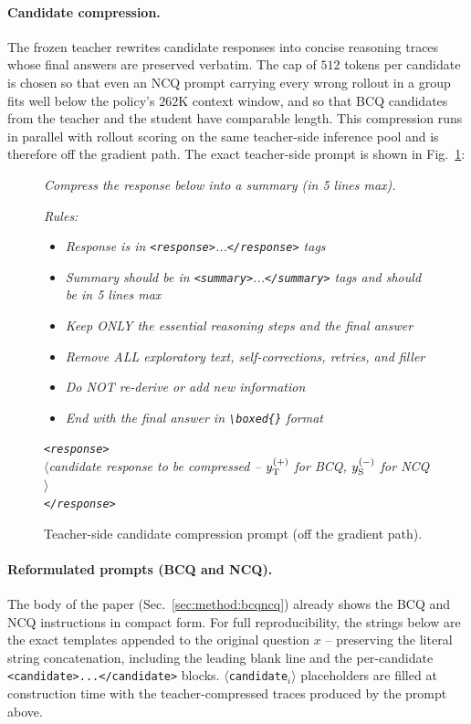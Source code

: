 \paragraph{Candidate compression.}
The frozen teacher rewrites candidate responses into concise reasoning traces whose final answers are preserved verbatim. The cap of $512$ tokens per candidate is chosen so that even an NCQ prompt carrying every wrong rollout in a group fits well below the policy's $262$K context window, and so that BCQ candidates from the teacher and the student have comparable length. This compression runs in parallel with rollout scoring on the same teacher-side inference pool and is therefore off the gradient path. The exact teacher-side prompt is shown in Fig.~\ref{fig:prompt-compression}:
\begin{figure}[!htbp]
\begin{prompttemplatefig}
\small
\emph{Compress the response below into a summary (in 5 lines max).}

\emph{Rules:}
\begin{itemize}[leftmargin=12pt,topsep=1pt,itemsep=1pt]
    \item \emph{Response is in \texttt{<response>}...\texttt{</response>} tags}
    \item \emph{Summary should be in \texttt{<summary>}...\texttt{</summary>} tags and should be in 5 lines max}
    \item \emph{Keep ONLY the essential reasoning steps and the final answer}
    \item \emph{Remove ALL exploratory text, self-corrections, retries, and filler}
    \item \emph{Do NOT re-derive or add new information}
    \item \emph{End with the final answer in \texttt{\textbackslash boxed\{\}} format}
\end{itemize}
\emph{\texttt{<response>}\\
$\langle$\emph{candidate response to be compressed} -- $y_{\rm T}^{(+)}$ for BCQ, $y_{\rm S}^{(-)}$ for NCQ$\rangle$\\
\texttt{</response>}}
\end{prompttemplatefig}
\caption{Teacher-side candidate compression prompt (off the gradient path).}
\label{fig:prompt-compression}
\end{figure}

\paragraph{Reformulated prompts (BCQ and NCQ).}
The body of the paper (Sec.~\ref{sec:method:bcqncq}) already shows the BCQ and NCQ instructions in compact form. For full reproducibility, the strings below are the exact templates appended to the original question $x$ -- preserving the literal string concatenation, including the leading blank line and the per-candidate \texttt{<candidate>...</candidate>} blocks. \texttt{$\langle$candidate$_i\rangle$} placeholders are filled at construction time with the teacher-compressed traces produced by the prompt above.

